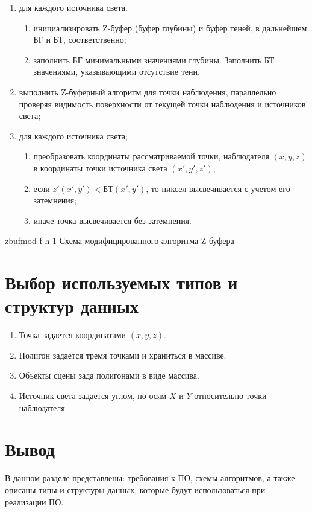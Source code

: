\begin{enumerate}
	\item для каждого источника света.
	
	\begin{enumerate}[label=\arabic{enumi}.\arabic*]
		\item инициализировать Z-буфер (буфер глубины)  и буфер теней, в дальнейшем БГ и БТ, соответственно;
		\item заполнить БГ минимальными значениями глубины.
		Заполнить БТ значениями, указывающими отсутствие тени.
	\end{enumerate}
	
	\item выполнить Z-буферный алгоритм для точки наблюдения, параллельно проверяя видимость поверхности от текущей точки наблюдения и источников света;
	\item для каждого источника света;
	
	\begin{enumerate}[label=\arabic{enumi}.\arabic*]
		\item преобразовать координаты рассматриваемой точки, наблюдателя $(x, y, z)$ в координаты точки источника света $(x', y', z')$;
		\item если $z'(x', y') < БТ(x', y')$, то пиксел высвечивается с учетом его затемнения;
		\item  иначе точка высвечивается без затемнения.
	\end{enumerate}
	
	
\end{enumerate}
\fi

	{zbufmod} %
	{f} %
	{h} %
	{1\textwidth} %
	{Схема модифицированного алгоритма Z-буфера} %

\clearpage


\section{Выбор используемых типов и структур данных}

\begin{enumerate}
	\item Точка задается координатами $(x, y, z)$.
	\item Полигон задается тремя точками и храниться в массиве.
	\item Объекты сцены зада полигонами в виде массива.
	\item Источник света задается углом, по осям $X$ и $Y$ относительно точки наблюдателя. 
\end{enumerate}

\section*{Вывод}
В данном разделе представлены: требования к ПО, схемы алгоритмов, а также описаны типы и структуры данных, которые будут использоваться при реализации ПО.


